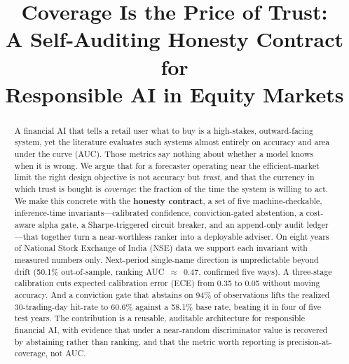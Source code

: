 \documentclass[conference]{IEEEtran}
\begin{document}
\title{Coverage Is the Price of Trust:\\
A Self-Auditing Honesty Contract for\\
Responsible AI in Equity Markets}

\author{
\and
{}
}

\maketitle

\begin{abstract}
A financial AI that tells a retail user what to buy is a high-stakes,
outward-facing system, yet the literature evaluates such systems almost entirely
on accuracy and area under the curve (AUC). Those metrics say nothing about whether
a model knows when it is wrong. We argue that for a forecaster operating near the
efficient-market limit the right design objective is not accuracy but \emph{trust},
and that the currency in which trust is bought is \emph{coverage}: the fraction of
the time the system is willing to act. We make this concrete with the
\textbf{honesty contract}, a set of five machine-checkable, inference-time
invariants---calibrated confidence, conviction-gated abstention, a cost-aware alpha
gate, a Sharpe-triggered circuit breaker, and an append-only audit ledger---that
together turn a near-worthless ranker into a deployable adviser. On eight years of
National Stock Exchange of India (NSE) data we support each invariant with measured
numbers only. Next-period single-name direction is unpredictable beyond drift
(50.1\% out-of-sample, ranking AUC~$\approx$~0.47, confirmed five ways). A
three-stage calibration cuts expected calibration error (ECE) from 0.35 to 0.05
without moving accuracy. And a conviction gate that abstains on 94\% of
observations lifts the realized 30-trading-day hit-rate to 60.6\% against a 58.1\%
base rate, beating it in four of five test years. The contribution is a reusable,
auditable architecture for responsible financial AI, with evidence that under a
near-random discriminator value is recovered by abstaining rather than ranking, and
that the metric worth reporting is precision-at-coverage, not AUC.
\end{abstract}
\end{document}
